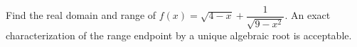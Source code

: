 Find the real domain and range of $f(x)=\sqrt{4-x}+\dfrac{1}{\sqrt{9-x^2}}$. An exact characterization of the range endpoint by a unique algebraic root is acceptable.
